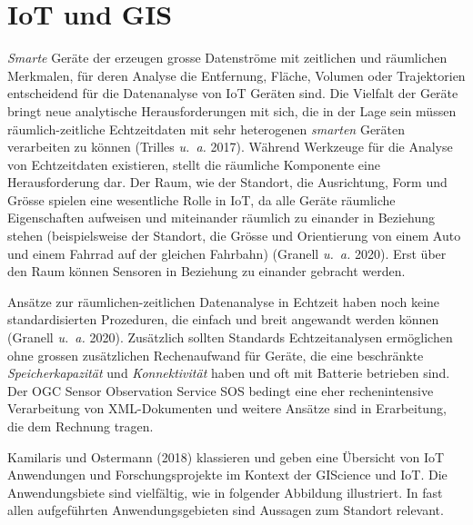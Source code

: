 \documentclass[
  11pt,
  a4paper,
  oneside, openany  ,captions=tableheading
]{scrbook}
\theoremstyle{remark}
\begin{document}
\section{IoT und GIS}\label{iot-und-gis}

\emph{Smarte} Geräte der erzeugen grosse Datenströme mit zeitlichen und
räumlichen Merkmalen, für deren Analyse die Entfernung, Fläche, Volumen
oder Trajektorien entscheidend für die Datenanalyse von IoT Geräten
sind. Die Vielfalt der Geräte bringt neue analytische Herausforderungen
mit sich, die in der Lage sein müssen räumlich-zeitliche Echtzeitdaten
mit sehr heterogenen \emph{smarten} Geräten verarbeiten zu können
(Trilles \emph{u.~a.} 2017). Während Werkzeuge für die Analyse von
Echtzeitdaten existieren, stellt die räumliche Komponente eine
Herausforderung dar. Der Raum, wie der Standort, die Ausrichtung, Form
und Grösse spielen eine wesentliche Rolle in IoT, da alle Geräte
räumliche Eigenschaften aufweisen und miteinander räumlich zu einander
in Beziehung stehen (beispielsweise der Standort, die Grösse und
Orientierung von einem Auto und einem Fahrrad auf der gleichen Fahrbahn)
(Granell \emph{u.~a.} 2020). Erst über den Raum können Sensoren in
Beziehung zu einander gebracht werden.

Ansätze zur räumlichen-zeitlichen Datenanalyse in Echtzeit haben noch
keine standardisierten Prozeduren, die einfach und breit angewandt
werden können (Granell \emph{u.~a.} 2020). Zusätzlich sollten Standards
Echtzeitanalysen ermöglichen ohne grossen zusätzlichen Rechenaufwand für
Geräte, die eine beschränkte \emph{Speicherkapazität} und
\emph{Konnektivität} haben und oft mit Batterie betrieben sind. Der OGC
Sensor Observation Service SOS bedingt eine eher rechenintensive
Verarbeitung von XML-Dokumenten und weitere Ansätze sind in Erarbeitung,
die dem Rechnung tragen.

Kamilaris und Ostermann (2018) klassieren und geben eine Übersicht von
IoT Anwendungen und Forschungsprojekte im Kontext
der GIScience und IoT. Die Anwendungsbiete sind vielfältig, wie in
folgender Abbildung illustriert. In fast allen aufgeführten
Anwendungsgebieten sind Aussagen zum Standort relevant.
\end{document}
